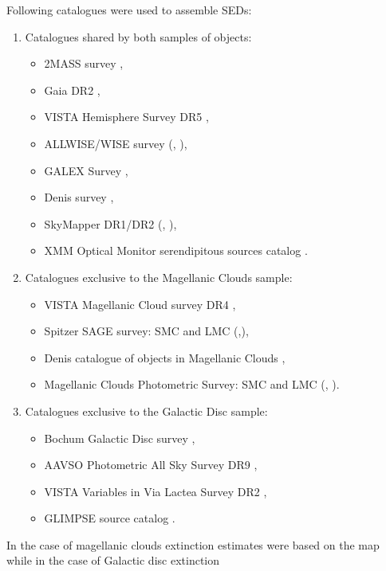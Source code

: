 \documentclass{pracalicmgr}
\begin{document}
Following catalogues were used to assemble SEDs:
\begin{enumerate}
\item Catalogues shared by both samples of objects:
\begin{itemize}
    \item 2MASS survey \citep{skrutskie_two_2006},
    \item Gaia DR2 \citep{gaia_collaboration_gaia_2018},
    \item VISTA Hemisphere Survey DR5 \citep{mcmahon_vizier_2021},
    \item ALLWISE/WISE survey (\citet*{wright_wide-field_2010}, \citet*{cutri_vizier_2021}),
    \item GALEX Survey \citep{bianchi_galex_2011},
    \item Denis survey  \citep{denis_vizier_2005},
    \item SkyMapper DR1/DR2 (\citet*{wolf_skymapper_2018}, \citet*{onken_skymapper_2019}),
    \item XMM Optical Monitor serendipitous sources catalog \citep{page_xmm-newton_2012}.
\end{itemize}
\item Catalogues exclusive to the Magellanic Clouds sample:
\begin{itemize}
    \item VISTA Magellanic Cloud survey DR4 \citep{cioni_vizier_2017},
    \item Spitzer SAGE survey: SMC and LMC (\citet*{meixner_spitzer_2006},\citet*{gordon_surveying_2011}),
    \item Denis catalogue of objects in Magellanic Clouds \citep{cioni_denis_2000},
    \item Magellanic Clouds Photometric Survey: SMC and LMC (\citet{zaritsky_magellanic_2002}, \citet{zaritsky_magellanic_2004}).
\end{itemize}
\item Catalogues exclusive to the Galactic Disc sample:
\begin{itemize}
    \item Bochum Galactic Disc survey \citep{hackstein_bochum_2015},
    \item AAVSO Photometric All Sky Survey DR9 \citep{henden_apass_2015},
    \item VISTA Variables in Via Lactea Survey DR2 \citep{minniti_vizier_2017},
    \item GLIMPSE source catalog \citep{spitzer_science_vizier_2009}.
\end{itemize} 
\end{enumerate} In the case of magellanic clouds extinction estimates were based on the map \citep{skowron_ogle-ing_2021} while in the case of Galactic disc extinction
\end{document}
